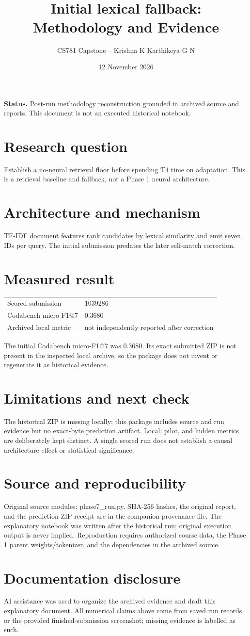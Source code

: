 \documentclass[11pt,a4paper]{article}
\title{Initial lexical fallback: Methodology and Evidence}
\author{CS781 Capstone -- Krishna K Karthikeya G N}
\date{12 November 2026}
\begin{document}
\maketitle
\noindent\textbf{Status.} Post-run methodology reconstruction grounded in archived source and reports. This document is not an executed historical notebook.\par
\section*{Research question}
Establish a no-neural retrieval floor before spending T4 time on adaptation. This is a retrieval baseline and fallback, not a Phase 1 neural architecture.
\section*{Architecture and mechanism}
TF-IDF document features rank candidates by lexical similarity and emit seven IDs per query. The initial submission predates the later self-match correction.
\section*{Measured result}
\begin{center}\begin{tabular}{ll}Scored submission & 1039286\\
Codabench micro-F1@7 & 0.3680\\
Archived local metric & not independently reported after correction\end{tabular}\end{center}
The initial Codabench micro-F1@7 was 0.3680. Its exact submitted ZIP is not present in the inspected local archive, so the package does not invent or regenerate it as historical evidence.
\section*{Limitations and next check}
The historical ZIP is missing locally; this package includes source and run evidence but no exact-byte prediction artifact. Local, pilot, and hidden metrics are deliberately kept distinct. A single scored run does not establish a causal architecture effect or statistical significance.
\section*{Source and reproducibility}
Original source modules: phase7\_run.py. SHA-256 hashes, the original report, and the prediction ZIP receipt are in the companion provenance file. The explanatory notebook was written after the historical run; original execution output is never implied. Reproduction requires authorized course data, the Phase 1 parent weights/tokenizer, and the dependencies in the archived source.
\section*{Documentation disclosure}
AI assistance was used to organize the archived evidence and draft this explanatory document. All numerical claims above come from saved run records or the provided finished-submission screenshot; missing evidence is labelled as such.
\end{document}
